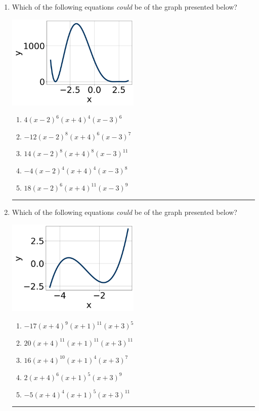 \documentclass[14pt]{extbook}
\newcommand{\litem}[1]{\item#1\hspace*{-1cm}\rule{\textwidth}{0.4pt}}
\begin{document}
\begin{enumerate}
{\begin{enumerate}[label=\Alph*.]
\end{enumerate} }
\litem{
Which of the following equations \textit{could} be of the graph presented below?
\begin{center}
    \includegraphics[width=0.5\textwidth]{../Figures/polyGraphToFunctionCopyB.png}
\end{center}
\begin{enumerate}[label=\Alph*.]
\item \( 4(x - 2)^{6} (x + 4)^{4} (x - 3)^{6} \)
\item \( -12(x - 2)^{8} (x + 4)^{6} (x - 3)^{7} \)
\item \( 14(x - 2)^{8} (x + 4)^{8} (x - 3)^{11} \)
\item \( -4(x - 2)^{4} (x + 4)^{4} (x - 3)^{8} \)
\item \( 18(x - 2)^{6} (x + 4)^{11} (x - 3)^{9} \)

\end{enumerate} }
\litem{
Which of the following equations \textit{could} be of the graph presented below?
\begin{center}
    \includegraphics[width=0.5\textwidth]{../Figures/polyGraphToFunctionB.png}
\end{center}
\begin{enumerate}[label=\Alph*.]
\item \( -17(x + 4)^{9} (x + 1)^{11} (x + 3)^{5} \)
\item \( 20(x + 4)^{11} (x + 1)^{11} (x + 3)^{11} \)
\item \( 16(x + 4)^{10} (x + 1)^{4} (x + 3)^{7} \)
\item \( 2(x + 4)^{6} (x + 1)^{5} (x + 3)^{9} \)
\item \( -5(x + 4)^{4} (x + 1)^{5} (x + 3)^{11} \)


\end{enumerate}}
\end{enumerate}
\end{document}
